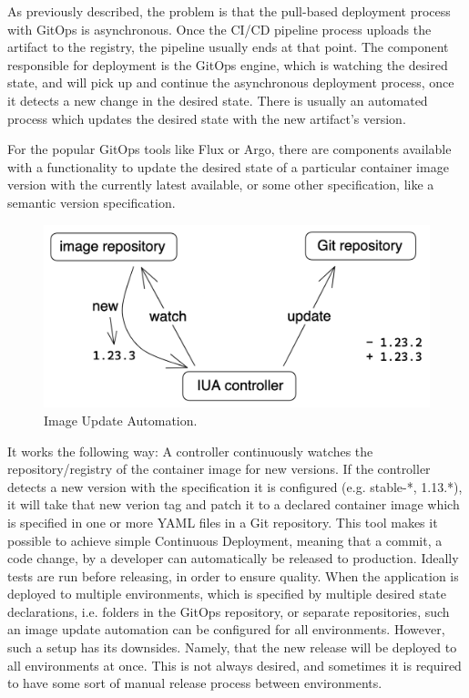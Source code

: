 As previously described, the problem is that the pull-based deployment process with GitOps is asynchronous.
Once the CI/CD pipeline process uploads the artifact to the registry, the pipeline usually ends at that point.
The component responsible for deployment is the GitOps engine, which is watching the desired state,
and will pick up and continue the asynchronous deployment process, once it detects a new change in the desired state.
There is usually an automated process which updates the desired state with the new artifact's version.


For the popular GitOps tools like Flux or Argo,
there are components available with a functionality to update the desired state
of a particular container image version with the currently latest available, or some other specification, like a semantic version specification.

\begin{figure}[h]
	\centering
	\includegraphics[width=0.72\linewidth]{assets/image-update-automation-illustration.png}
	\caption{Image Update Automation.
	}
	\label{fig:image-update-automation-illustration}	
\end{figure}

It works the following way: A controller continuously watches the repository/registry of the container image for new versions.
If the controller detects a new version with the specification it is configured (e.g. stable-*, 1.13.*),
it will take that new verion tag and patch it to a declared container image which is specified in one or more YAML files in a Git repository.
This tool makes it possible to achieve simple Continuous Deployment,
meaning that a commit, a code change, by a developer can automatically be released to production.
Ideally tests are run before releasing, in order to ensure quality.
When the application is deployed to multiple environments, which is specified by multiple desired state declarations,
i.e. folders in the GitOps repository, or separate repositories,
such an image update automation can be configured for all environments.
However, such a setup has its downsides.
Namely, that the new release will be deployed to all environments at once.
This is not always desired, and sometimes it is required to have some sort of manual release process between environments.

